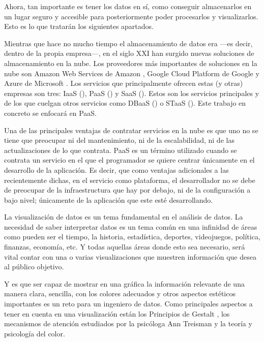 {Ahora, tan importante es tener los datos en sí, como conseguir almacenarlos en un lugar seguro y accesible para posteriormente poder procesarlos y visualizarlos. Esto es lo que tratarán los siguientes apartados.

Mientras que hace no mucho tiempo el almacenamiento de datos era  —es decir, dentro de la propia empresa—, en el siglo XXI han surgido nuevas soluciones de almacenamiento en la nube. Los proveedores más importantes de soluciones en la nube son Amazon Web Services de Amazon \parencite{AWS}, Google Cloud Platform de Google \parencite{GoogleCloud} y Azure de Microsoft \parencite{Azure}. Los servicios que principalmente ofrecen estas (y otras) empresas son tres: IaaS (), PaaS () y SaaS (). Estos son los servicios principales y de los que cuelgan otros servicios como DBaaS () o STaaS (). Este trabajo en concreto se enfocará en PaaS.

Una de las principales ventajas de contratar servicios en la nube es que uno no se tiene que preocupar ni del mantenimiento, ni de la escalabilidad, ni de las actualizaciones de lo que contrata. PaaS es un término utilizado cuando se contrata un servicio en el que el programador se quiere centrar únicamente en el desarrollo de la aplicación. Es decir, que como ventajas adicionales a las recientemente dichas, en el servicio como plataforma, el desarrollador no se debe de preocupar de la infraestructura que hay por debajo, ni de la configuración a bajo nivel; únicamente de la aplicación que este esté desarrollando.

La visualización de datos es un tema fundamental en el análisis de datos. La necesidad de saber interpretar datos es un tema común en una infinidad de áreas como pueden ser el tiempo, la historia, estadística, deportes, videojuegos, política, finanzas, economía, etc. Y todas aquellas áreas donde esto sea necesario, será vital contar con una o varias visualizaciones que muestren información que desea al público objetivo.

Y es que ser capaz de mostrar en una gráfica la información relevante de una manera clara, sencilla, con los colores adecuados y otros aspectos estéticos importantes es un reto para un ingeniero de datos. Como principales aspectos a tener en cuenta en una visualización están los Principios de Gestalt \parencite{gestalt}, los mecanismos de atención estudiados por la psicóloga Ann Treisman \parencite{treisman} y la teoría y psicología del color.

}
